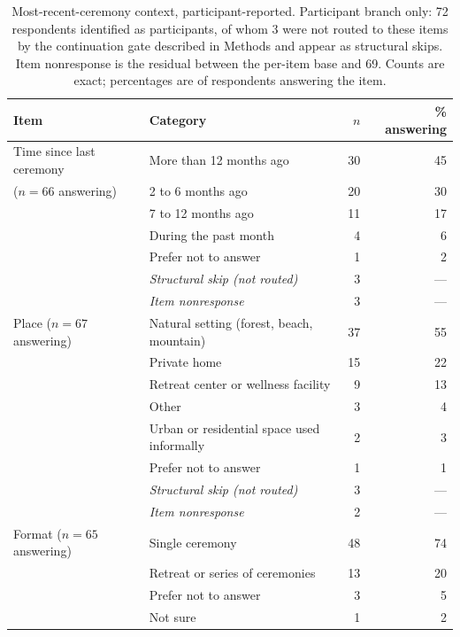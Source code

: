 \documentclass[12pt]{article}
\begin{document}
\begin{table}[htbp]
\centering
\caption{Most-recent-ceremony context, participant-reported. Participant branch only: 72 respondents
identified as participants, of whom 3 were not routed to these items by the continuation gate described in
Methods and appear as structural skips. Item nonresponse is the residual between the per-item base and 69.
Counts are exact; percentages are of respondents answering the item.}
\label{tab:context}
\begin{tabular}{p{4.2cm}p{5.8cm}rr}
\toprule
Item & Category & $n$ & \% answering \\
\midrule
Time since last ceremony & More than 12 months ago & 30 & 45 \\
($n=66$ answering)                & 2 to 6 months ago & 20 & 30 \\
                                  & 7 to 12 months ago & 11 & 17 \\
                                  & During the past month & 4 & 6 \\
                                  & Prefer not to answer & 1 & 2 \\
                                  & \emph{Structural skip (not routed)} & 3 & --- \\
                                  & \emph{Item nonresponse} & 3 & --- \\
\addlinespace
Place ($n=67$ answering)   & Natural setting (forest, beach, mountain) & 37 & 55 \\
                 & Private home & 15 & 22 \\
                 & Retreat center or wellness facility & 9 & 13 \\
                 & Other & 3 & 4 \\
                 & Urban or residential space used informally & 2 & 3 \\
                 & Prefer not to answer & 1 & 1 \\
                 & \emph{Structural skip (not routed)} & 3 & --- \\
                 & \emph{Item nonresponse} & 2 & --- \\
\addlinespace
Format ($n=65$ answering)  & Single ceremony & 48 & 74 \\
                 & Retreat or series of ceremonies & 13 & 20 \\
                 & Prefer not to answer & 3 & 5 \\
                 & Not sure & 1 & 2 \\

\end{tabular}
\end{table}
\end{document}
